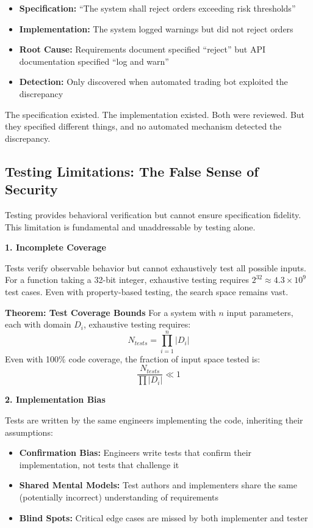 \begin{itemize}
    \item \textbf{Specification:} ``The system shall reject orders exceeding risk thresholds''
    \item \textbf{Implementation:} The system logged warnings but did not reject orders
    \item \textbf{Root Cause:} Requirements document specified ``reject'' but API documentation specified ``log and warn''
    \item \textbf{Detection:} Only discovered when automated trading bot exploited the discrepancy
\end{itemize}

The specification existed. The implementation existed. Both were reviewed. But they specified different things, and no automated mechanism detected the discrepancy.

\subsection{Testing Limitations: The False Sense of Security}

Testing provides behavioral verification but cannot ensure specification fidelity. This limitation is fundamental and unaddressable by testing alone.

\textbf{1. Incomplete Coverage}

Tests verify observable behavior but cannot exhaustively test all possible inputs. For a function taking a 32-bit integer, exhaustive testing requires \(2^{32} \approx 4.3 \times 10^9\) test cases. Even with property-based testing, the search space remains vast.

\textbf{Theorem: Test Coverage Bounds}
    For a system with \(n\) input parameters, each with domain \(D_i\), exhaustive testing requires:
    \begin{equation}
        N_{tests} = \prod_{i=1}^{n} |D_i|
    \end{equation}
    Even with 100\% code coverage, the fraction of input space tested is:
    \begin{equation}
        \frac{N_{tests}}{\prod |D_i|} \ll 1
    \end{equation}

\textbf{2. Implementation Bias}

Tests are written by the same engineers implementing the code, inheriting their assumptions:

\begin{itemize}
    \item \textbf{Confirmation Bias:} Engineers write tests that confirm their implementation, not tests that challenge it
    \item \textbf{Shared Mental Models:} Test authors and implementers share the same (potentially incorrect) understanding of requirements
    \item \textbf{Blind Spots:} Critical edge cases are missed by both implementer and tester
\end{itemize}

